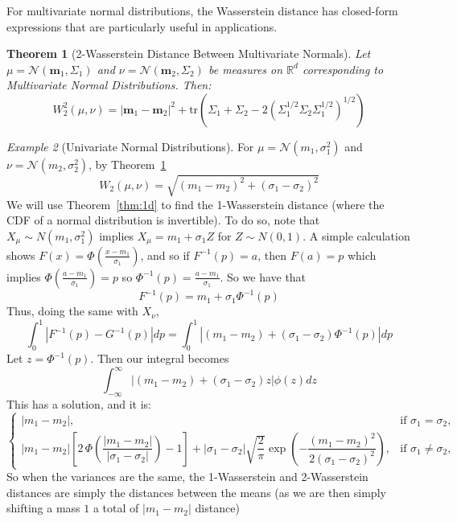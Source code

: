 \documentclass[11pt,a4paper]{article}
\newtheorem{theorem}{Theorem}[section]
\theoremstyle{remark}
\newtheorem{example}[theorem]{Example}
\begin{document}
For multivariate normal distributions, the Wasserstein distance has closed-form expressions that are particularly useful in applications.

\begin{theorem}[2-Wasserstein Distance Between Multivariate Normals] \label{thm:2d}
Let \( \mu = \mathcal{N}(\mathbf{m}_1, \Sigma_1) \) and \( \nu = \mathcal{N}(\mathbf{m}_2, \Sigma_2) \) be measures on \( \mathbb{R}^d \) corresponding to Multivariate Normal Distributions. Then:
\[
W_2^2(\mu,\nu) = |\mathbf{m}_1 - \mathbf{m}_2|^2 + \text{tr}(\Sigma_1 + \Sigma_2 - 2(\Sigma_1^{1/2}\Sigma_2\Sigma_1^{1/2})^{1/2})
\]
\end{theorem}

\begin{example}[Univariate Normal Distributions]
For \( \mu = \mathcal{N}(m_1, \sigma_1^2) \) and \( \nu = \mathcal{N}(m_2, \sigma_2^2) \), by Theorem~\ref{thm:2d}
\[
W_2(\mu,\nu) = \sqrt{(m_1-m_2)^2 + (\sigma_1-\sigma_2)^2}
\]
We will use Theorem~\ref{thm:1d} to find the 1-Wasserstein distance (where the CDF of a normal distribution is invertible). To do so, note that $X_ \mu \sim N(m_1, \sigma_1 ^2)$ implies $X_\mu = m_1 + \sigma_1 Z$ for $Z \sim N(0,1)$. A simple calculation shows $F(x) = \Phi \left ( \frac{x - m_1}{\sigma_1} \right)$, and so if $F^{-1}(p) = a$, then $F(a) = p$ which implies $\Phi \left (\frac{a - m_1}{\sigma_1} \right) = p$ so $\Phi ^{-1}(p) = \frac{a - m_1}{\sigma_1}$. So we have that \[
F^{-1}(p) = m_1 + \sigma_1 \Phi^{-1}(p)
\]
Thus, doing the same with $X_\nu$, \[
\int _0 ^1 |F^{-1} (p) - G^{-1}(p)|dp = \int _0 ^1 |(m_1 - m_2) + (\sigma_1 - \sigma_2) \Phi ^{-1}(p)| dp 
\]
Let $z = \Phi ^{-1}(p)$. Then our integral becomes \[
\int _{-\infty}^{\infty} |(m_1 - m_2) + (\sigma_1 - \sigma_2)z| \phi (z)dz
\]
This has a solution, and it is: \[
\begin{cases}
|m_1 - m_2|, & \text{if } \sigma_1 = \sigma_2, \\[10pt]
|m_1 - m_2|
\left[
2\,\Phi\!\left(
\dfrac{|m_1 - m_2|}{|\sigma_1 - \sigma_2|}
\right)
- 1
\right]
+ 
|\sigma_1 - \sigma_2|
\sqrt{\dfrac{2}{\pi}}
\exp\!\left(
-\dfrac{(m_1 - m_2)^2}{2(\sigma_1 - \sigma_2)^2}
\right),
& \text{if } \sigma_1 \neq \sigma_2,
\end{cases}
\]
So when the variances are the same, the 1-Wasserstein and 2-Wasserstein distances are simply the distances between the means (as we are then simply shifting a mass $1$ a total of $|m_1 - m_2|$ distance)
\end{example}
\end{document}

